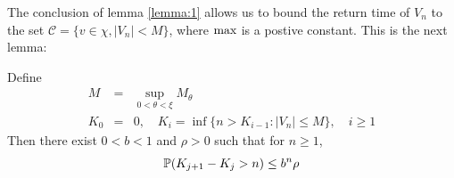 The conclusion of lemma \ref{lemma:1} allows us to bound the return
time of $V_n$ to the set $\mathcal C = \{v \in \chi, |V_n| < M\}$, where
${\text{max}}$ is a postive constant. This is the next lemma:
\begin{lemma}
  \label{lemma:2}
  Define
  \begin{eqnarray}
    M
    &=&
    \sup_{0 < \theta < \xi} M_{\theta} \label{eq:M_def}\\
    K_0 &=& 0, \quad 
    K_i =
    \inf\{n > K_{i-1}: |V_n| \leq M \},\quad i \geq 1
    \label{eq:K_def}
  \end{eqnarray}
  Then there exist $0 < b < 1$ and $\rho > 0$ such that for
  $n \geq 1$,
  \begin{equation}
    \label{eq:koef}
    \P (K_{j+1} - K_j > n)
    \leq
    b^n \rho
  \end{equation}
\end{lemma}
